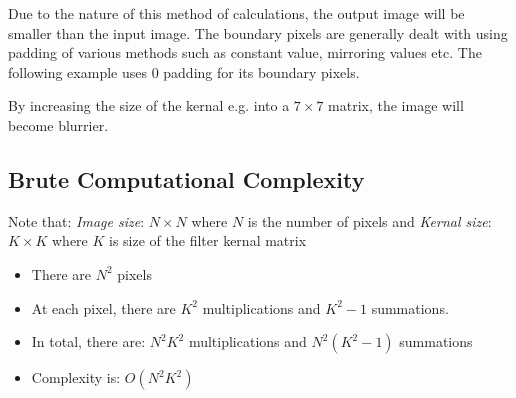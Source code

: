 \documentclass{report}
\begin{document}
Due to the nature of this method of calculations, the output image will be
smaller than the input image. The boundary pixels are generally dealt with using
padding of various methods such as constant value, mirroring values etc. The
following example uses 0 padding for its boundary pixels. 

\begin{minipage}{7in}
    \centering
    \hspace*{.2in}
\end{minipage}

By increasing the size of the kernal e.g. into a $7 \times 7$ matrix, the image
will become blurrier. 

\vfill

\subsection{Brute Computational Complexity}

Note that: \textit{Image size}: $N \times N$ where $N$ is the number of pixels and
\textit{Kernal size}: $K \times K$ where $K$ is size of the filter kernal matrix 
\begin{itemize}
    \item There are $N^2$ pixels 
    \item At each pixel, there are $K^2$ multiplications and $K^2 - 1$ summations.
    \item In total, there are: $N^2 K^2$ multiplications and $N^2(K^2 - 1)$
    summations 
    \item Complexity is: $O(N^2 K^2)$
\end{itemize}
\end{document}
